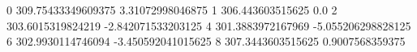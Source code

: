 0 309.75433349609375 3.31072998046875
1 306.443603515625 0.0
2 303.6015319824219 -2.842071533203125
4 301.3883972167969 -5.055206298828125
6 302.9930114746094 -3.450592041015625
8 307.3443603515625 0.9007568359375
